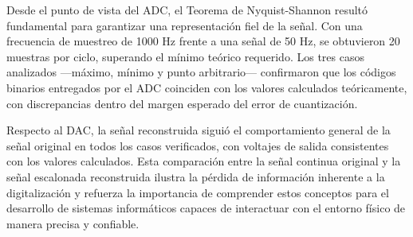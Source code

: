 \documentclass[12pt,letterpaper]{article}
\begin{document}
    Desde el punto de vista del ADC, el Teorema de Nyquist-Shannon resultó fundamental 
    para garantizar una representación fiel de la señal. Con una frecuencia de muestreo de 
    1000 Hz frente a una señal de 50 Hz, se obtuvieron 20 muestras por ciclo, superando 
    el mínimo teórico requerido. Los tres casos analizados —máximo, mínimo y punto 
    arbitrario— confirmaron que los códigos binarios entregados por el ADC coinciden con 
    los valores calculados teóricamente, con discrepancias dentro del margen esperado del 
    error de cuantización.

    Respecto al DAC, la señal reconstruida siguió el comportamiento general de la señal 
    original en todos los casos verificados, con voltajes de salida consistentes con los 
    valores calculados. Esta comparación entre la señal continua original y la señal 
    escalonada reconstruida ilustra la pérdida de información inherente a la digitalización 
    y refuerza la importancia de comprender estos conceptos para el desarrollo de sistemas 
    informáticos capaces de interactuar con el entorno físico de manera precisa y confiable.
\end{document}
